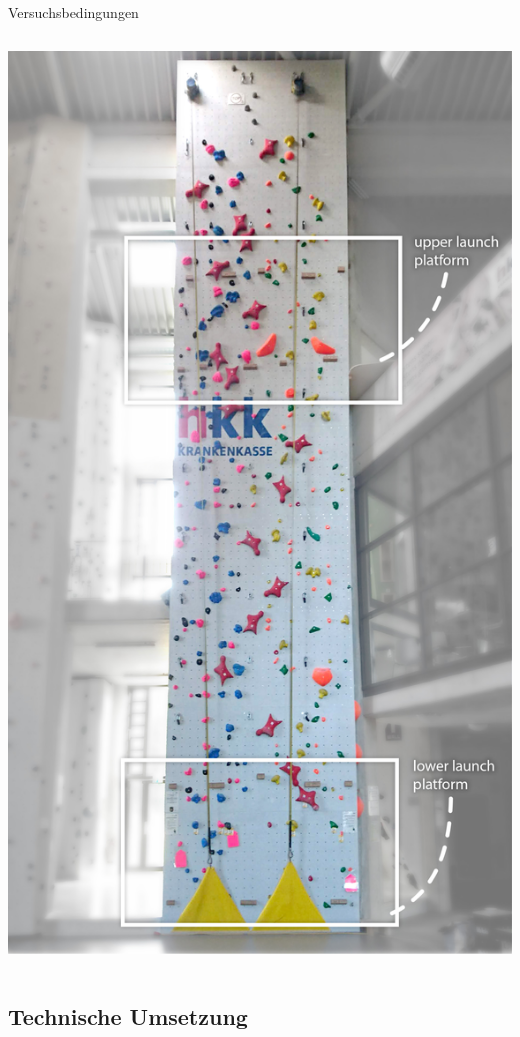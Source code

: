 \begin{frame}{Versuchsbedingungen}
\begin{columns}
\begin{column}{0.5\textwidth}
\begin{center}
			\includegraphics[height=1.2\textheight]{include/images/climbing-wall-photo.jpg}
		\end{center}
	\end{column}
\end{columns}
\end{frame}

\subsection{Technische Umsetzung}

